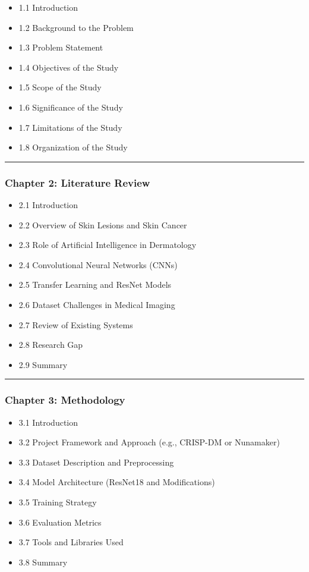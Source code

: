 \documentclass[
  12pt,
  oneside]{article}
\providecommand{\tightlist}{%
  \setlength{\itemsep}{0pt}\setlength{\parskip}{0pt}}
\begin{document}
\begin{itemize}
\tightlist
\item
  1.1 Introduction
\item
  1.2 Background to the Problem
\item
  1.3 Problem Statement
\item
  1.4 Objectives of the Study
\item
  1.5 Scope of the Study
\item
  1.6 Significance of the Study
\item
  1.7 Limitations of the Study
\item
  1.8 Organization of the Study
\end{itemize}

\begin{center}\rule{0.5\linewidth}{0.5pt}\end{center}

\subsubsection{Chapter 2: Literature
Review}\label{chapter-2-literature-review}

\begin{itemize}
\tightlist
\item
  2.1 Introduction
\item
  2.2 Overview of Skin Lesions and Skin Cancer
\item
  2.3 Role of Artificial Intelligence in Dermatology
\item
  2.4 Convolutional Neural Networks (CNNs)
\item
  2.5 Transfer Learning and ResNet Models
\item
  2.6 Dataset Challenges in Medical Imaging
\item
  2.7 Review of Existing Systems
\item
  2.8 Research Gap
\item
  2.9 Summary
\end{itemize}

\begin{center}\rule{0.5\linewidth}{0.5pt}\end{center}

\subsubsection{Chapter 3: Methodology}\label{chapter-3-methodology}

\begin{itemize}
\tightlist
\item
  3.1 Introduction
\item
  3.2 Project Framework and Approach (e.g., CRISP-DM or Nunamaker)
\item
  3.3 Dataset Description and Preprocessing
\item
  3.4 Model Architecture (ResNet18 and Modifications)
\item
  3.5 Training Strategy
\item
  3.6 Evaluation Metrics
\item
  3.7 Tools and Libraries Used
\item
  3.8 Summary
\end{itemize}
\end{document}
